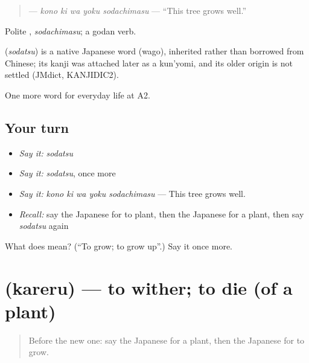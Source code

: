 \begin{quote}
\textbf{   } — \emph{kono ki wa yoku sodachimasu} — \textquotedblleft{}This tree grows well.\textquotedblright{}
\end{quote}

Polite \textbf{}, \emph{sodachimasu}; a godan verb.

\begin{cousinweb}
\textbf{} (\emph{sodatsu}) is a native Japanese word (wago), inherited rather than borrowed from Chinese; its kanji was attached later as a kun'yomi, and its older origin is not settled (JMdict, KANJIDIC2).
\end{cousinweb}

\begin{grammarlens}[title={What you've built}]
One more word for everyday life at A2.
\end{grammarlens}

\subsection*{Your turn}
\begin{itemize}
\raggedright
  \item \emph{Say it:} \emph{sodatsu}
  \item \emph{Say it:} \emph{sodatsu}, once more
  \item \emph{Say it:} \emph{kono ki wa yoku sodachimasu} — This tree grows well.
  \item \emph{Recall:} say the Japanese for to plant, then the Japanese for a plant, then say \emph{sodatsu} again
\end{itemize}

\begin{tcolorbox}[breakable,colback=teal!4,colframe=teal!35!black,title={Before you move on}]
What does  mean? (\textquotedblleft{}To grow; to grow up\textquotedblright{}.) Say it once more.
\end{tcolorbox}
\section[\texorpdfstring{\ja{かれる} (kareru)}{かれる (kareru)}]{ (kareru) — to wither; to die (of a plant)}

\label{lesson:JA-C210-kareru}



\begin{quote}
Before the new one: say the Japanese for a plant, then the Japanese for to grow.
\end{quote}

